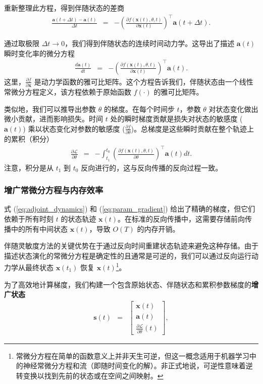 \documentclass[UTF8,a4paper,zihao=-4,oneside,openany]{ctexbook}
\begin{document}
重新整理此方程，得到伴随状态的差商
\begin{eqnarray}
\frac{\mathbf{a}(t+\Delta t) - \mathbf{a}(t)}{\Delta t} & = & - \left( \frac{\partial f(\mathbf{x}(t), \theta, t)}{\partial \mathbf{x}(t)} \right)^\top \mathbf{a}(t+\Delta t).
\end{eqnarray}

通过取极限 $\Delta t \to 0$，我们得到伴随状态的连续时间动力学。这导出了描述 $\mathbf{a}(t)$ 瞬时变化率的微分方程
\begin{eqnarray}
\frac{d \mathbf{a}(t)}{d t} & = & - \left( \frac{\partial f(\mathbf{x}(t), \theta, t)}{\partial \mathbf{x}(t)} \right)^\top \mathbf{a}(t) . \label{eq:adjoint_dynamics}
\end{eqnarray}
这里，$\frac{\partial f}{\partial \mathbf{x}}$ 是动力学函数的雅可比矩阵。这个方程告诉我们，伴随状态由一个线性常微分方程定义，该方程依赖于原始函数 $f(\cdot)$ 的雅可比矩阵。

类似地，我们可以推导出参数 $\theta$ 的梯度。在每个时间步 $t$，参数 $\theta$ 对状态变化做出微小贡献，进而影响损失。时间 $t$ 处的瞬时梯度贡献是损失对状态的敏感度 ($\mathbf{a}(t)$) 乘以状态变化对参数的敏感度 ($\frac{\partial f}{\partial \theta}$)。总梯度是这些瞬时贡献在整个轨迹上的累积（积分）
\begin{eqnarray}
\frac{\partial \mathcal{L}}{\partial \theta} & = & - \int_{t_1}^{t_0} \left( \frac{\partial f(\mathbf{x}(t), \theta, t)}{\partial \theta} \right)^\top \mathbf{a}(t) dt. \label{eq:param_gradient}
\end{eqnarray}
注意，积分是从 $t_1$ 到 $t_0$ 反向进行的，这与反向传播的反向过程一致。
\subsubsection{增广常微分方程与内存效率}

式 (\ref{eq:adjoint_dynamics}) 和 (\ref{eq:param_gradient}) 给出了精确的梯度，但它们依赖于所有时刻 $t$ 的状态轨迹 $\mathbf{x}(t)$。在标准的反向传播中，这需要存储前向传播中的所有中间状态 $\mathbf{x}(t)$，导致 $O(T)$ 的内存开销。

伴随灵敏度方法的关键优势在于通过反向时间重建状态轨迹来避免这种存储。由于描述状态演化的常微分方程是确定性的且通常是可逆的，我们可以通过反向运行动力学从最终状态 $\mathbf{x}(t_1)$ 恢复 $\mathbf{x}(t)$\footnote{常微分方程在简单的函数意义上并非天生可逆，但这一概念适用于机器学习中的神经常微分方程和流（即随时间变化的解）。非正式地说，可逆性意味着逆转变换以找到先前的状态或在空间之间映射。}。

为了高效地计算梯度，我们构建一个包含原始状态、伴随状态和累积参数梯度的\textbf{增广状态}
\begin{eqnarray}
\mathbf{s}(t) & = & \begin{bmatrix} \mathbf{x}(t) \\ \mathbf{a}(t) \\ \frac{\partial \mathcal{L}}{\partial \theta}(t) \end{bmatrix},
\end{eqnarray}
\end{document}
